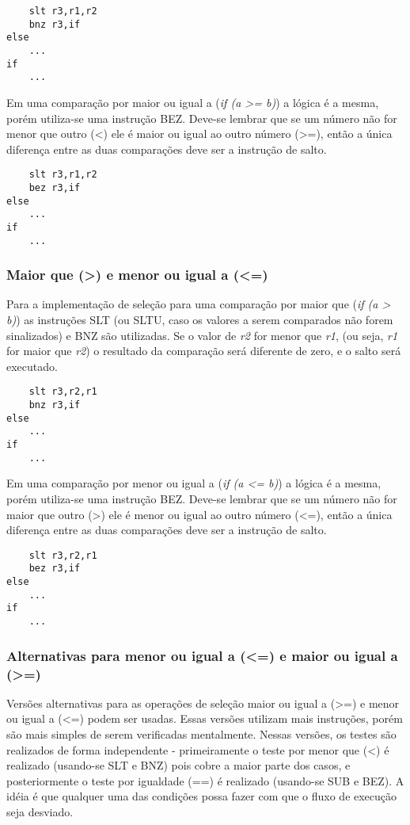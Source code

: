 \documentclass{extreport}
\begin{document}
\begin{verbatim}
    slt r3,r1,r2
    bnz r3,if
else
    ...
if
    ...
\end{verbatim}

Em uma comparação por maior ou igual a (\textit{if (a >= b)}) a lógica é a mesma, porém utiliza-se uma instrução BEZ. Deve-se lembrar que se um número não for menor que outro (<) ele é maior ou igual ao outro número (>=), então a única diferença entre as duas comparações deve ser a instrução de salto.

\begin{verbatim}
    slt r3,r1,r2
    bez r3,if
else
    ...
if
    ...
\end{verbatim}

\subsubsection{Maior que (>) e menor ou igual a (<=)}

Para a implementação de seleção para uma comparação por maior que (\textit{if (a > b)}) as instruções SLT (ou SLTU, caso os valores a serem comparados não forem sinalizados) e BNZ são utilizadas. Se o valor de \textit{r2} for menor que \textit{r1}, (ou seja, \textit{r1} for maior que \textit{r2}) o resultado da comparação será diferente de zero, e o salto será executado.

\begin{verbatim}
    slt r3,r2,r1
    bnz r3,if
else
    ...
if
    ...
\end{verbatim}

Em uma comparação por menor ou igual a (\textit{if (a <= b)}) a lógica é a mesma, porém utiliza-se uma instrução BEZ. Deve-se lembrar que se um número não for maior que outro (>) ele é menor ou igual ao outro número (<=), então a única diferença entre as duas comparações deve ser a instrução de salto.

\begin{verbatim}
    slt r3,r2,r1
    bez r3,if
else
    ...
if
    ...
\end{verbatim}

\subsubsection{Alternativas para menor ou igual a (<=) e maior ou igual a (>=)}

Versões alternativas para as operações de seleção maior ou igual a (>=) e menor ou igual a (<=) podem ser usadas. Essas versões utilizam mais instruções, porém são mais simples de serem verificadas mentalmente. Nessas versões, os testes são realizados de forma independente - primeiramente o teste por menor que (<) é realizado (usando-se SLT e BNZ) pois cobre a maior parte dos casos, e posteriormente o teste por igualdade (==) é realizado (usando-se SUB e BEZ). A idéia é que qualquer uma das condições possa fazer com que o fluxo de execução seja desviado.
\end{document}
